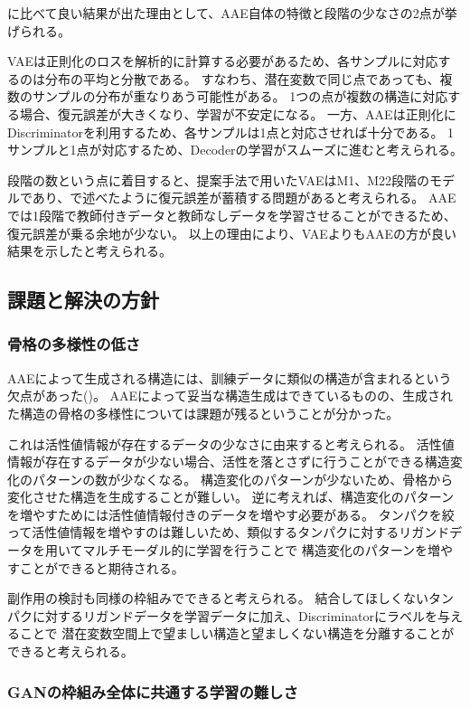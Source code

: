 に比べて良い結果が出た理由として、AAE自体の特徴と段階の少なさの2点が挙げられる。

VAEは正則化のロスを解析的に計算する必要があるため、各サンプルに対応するのは分布の平均と分散である。
すなわち、潜在変数で同じ点であっても、複数のサンプルの分布が重なりあう可能性がある。
1つの点が複数の構造に対応する場合、復元誤差が大きくなり、学習が不安定になる。
一方、AAEは正則化にDiscriminatorを利用するため、各サンプルは1点と対応させれば十分である。
1サンプルと1点が対応するため、Decoderの学習がスムーズに進むと考えられる。

段階の数という点に着目すると、提案手法で用いたVAEはM1、M22段階のモデルであり、で述べたように復元誤差が蓄積する問題があると考えられる。
AAEでは1段階で教師付きデータと教師なしデータを学習させることができるため、復元誤差が乗る余地が少ない。
以上の理由により、VAEよりもAAEの方が良い結果を示したと考えられる。

\subsection{課題と解決の方針}

\subsubsection{骨格の多様性の低さ}

AAEによって生成される構造には、訓練データに類似の構造が含まれるという欠点があった()。
AAEによって妥当な構造生成はできているものの、生成された構造の骨格の多様性については課題が残るということが分かった。

これは活性値情報が存在するデータの少なさに由来すると考えられる。
活性値情報が存在するデータが少ない場合、活性を落とさずに行うことができる構造変化のパターンの数が少なくなる。
構造変化のパターンが少ないため、骨格から変化させた構造を生成することが難しい。
逆に考えれば、構造変化のパターンを増やすためには活性値情報付きのデータを増やす必要がある。
タンパクを絞って活性値情報を増やすのは難しいため、類似するタンパクに対するリガンドデータを用いてマルチモーダル的に学習を行うことで
構造変化のパターンを増やすことができると期待される。

副作用の検討も同様の枠組みでできると考えられる。
結合してほしくないタンパクに対するリガンドデータを学習データに加え、Discriminatorにラベルを与えることで
潜在変数空間上で望ましい構造と望ましくない構造を分離することができると考えられる。

\subsubsection{GANの枠組み全体に共通する学習の難しさ}

